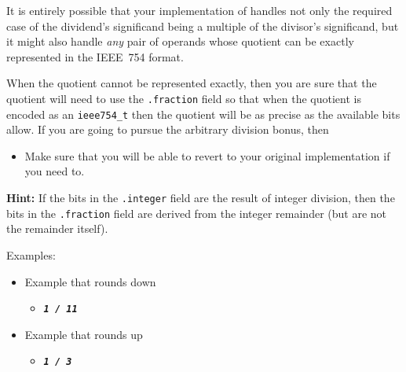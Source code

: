 It is entirely possible that your implementation of  handles not only the required case of the dividend's significand being a multiple of the divisor's significand,
but it might also handle \textit{any} pair of operands whose quotient can be exactly represented in the IEEE~754 format.

When the quotient cannot be represented exactly, then you are sure that the quotient will need to use the \lstinline{.fraction} field so that when the quotient is encoded as an \lstinline{ieee754_t} then the quotient will be as precise as the available bits allow.
If you are going to pursue the arbitrary division bonus, then
\begin{description}
    \checkoffitem{\textcolor{red}{Be sure that you have a backup copy of your work!}}
    \begin{itemize}
        \item Make sure that you will be able to revert to your original  implementation if you need to.
    \end{itemize}
\end{description}
\textbf{Hint:} If the bits in the \lstinline{.integer} field are the result of integer division,
then the bits in the \lstinline{.fraction} field are derived from the integer remainder (but are not the remainder itself).

Examples:
\begin{itemize}
    \item Example that rounds down
    \begin{itemize}
        \item[] \texttt{\textbf{\textit{1 / 11}}}
    \end{itemize}
    \item Example that rounds up
    \begin{itemize}
        \item[] \texttt{\textbf{\textit{1 / 3}}}
    \end{itemize}
\end{itemize}
